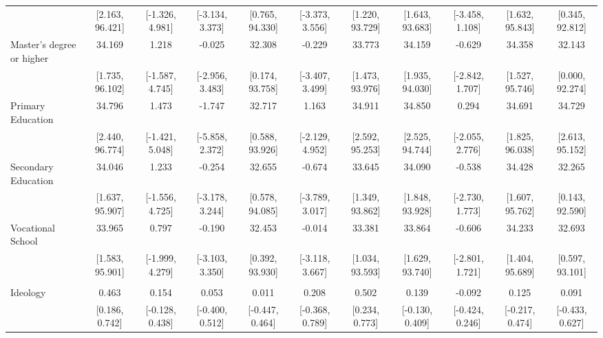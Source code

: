 \documentclass[
  10,
  letterpaper,
  DIV=11,
  numbers=noendperiod]{scrartcl}
\begin{document}
\begin{table}
\begin{tabular}[t]{lcccccccccc}
\hspace{1em} & {}[2.163, 96.421] & {}[-1.326, 4.981] & {}[-3.134, 3.373] & {}[0.765, 94.330] & {}[-3.373, 3.556] & {}[1.220, 93.729] & {}[1.643, 93.683] & {}[-3.458, 1.108] & {}[1.632, 95.843] & {}[0.345, 92.812]\\
\hspace{1em}Master's degree or higher & 34.169 & 1.218 & -0.025 & 32.308 & -0.229 & 33.773 & 34.159 & -0.629 & 34.358 & 32.143\\
\hspace{1em} & {}[1.735, 96.102] & {}[-1.587, 4.745] & {}[-2.956, 3.483] & {}[0.174, 93.758] & {}[-3.407, 3.499] & {}[1.473, 93.976] & {}[1.935, 94.030] & {}[-2.842, 1.707] & {}[1.527, 95.746] & {}[0.000, 92.274]\\
\hspace{1em}Primary Education & 34.796 & 1.473 & -1.747 & 32.717 & 1.163 & 34.911 & 34.850 & 0.294 & 34.691 & 34.729\\
\hspace{1em} & {}[2.440, 96.774] & {}[-1.421, 5.048] & {}[-5.858, 2.372] & {}[0.588, 93.926] & {}[-2.129, 4.952] & {}[2.592, 95.253] & {}[2.525, 94.744] & {}[-2.055, 2.776] & {}[1.825, 96.038] & {}[2.613, 95.152]\\
\hspace{1em}Secondary Education & 34.046 & 1.233 & -0.254 & 32.655 & -0.674 & 33.645 & 34.090 & -0.538 & 34.428 & 32.265\\
\hspace{1em} & {}[1.637, 95.907] & {}[-1.556, 4.725] & {}[-3.178, 3.244] & {}[0.578, 94.085] & {}[-3.789, 3.017] & {}[1.349, 93.862] & {}[1.848, 93.928] & {}[-2.730, 1.773] & {}[1.607, 95.762] & {}[0.143, 92.590]\\
\hspace{1em}Vocational School & 33.965 & 0.797 & -0.190 & 32.453 & -0.014 & 33.381 & 33.864 & -0.606 & 34.233 & 32.693\\
\hspace{1em} & {}[1.583, 95.901] & {}[-1.999, 4.279] & {}[-3.103, 3.350] & {}[0.392, 93.930] & {}[-3.118, 3.667] & {}[1.034, 93.593] & {}[1.629, 93.740] & {}[-2.801, 1.721] & {}[1.404, 95.689] & {}[0.597, 93.101]\\
\addlinespace[0.3em]
\multicolumn{11}{l}{\cellcolor[HTML]{3498DB}{\textbf{Ideology}}}\\
\hspace{1em}Ideology & 0.463 & 0.154 & 0.053 & 0.011 & 0.208 & 0.502 & 0.139 & -0.092 & 0.125 & 0.091\\
\hspace{1em} & {}[0.186, 0.742] & {}[-0.128, 0.438] & {}[-0.400, 0.512] & {}[-0.447, 0.464] & {}[-0.368, 0.789] & {}[0.234, 0.773] & {}[-0.130, 0.409] & {}[-0.424, 0.246] & {}[-0.217, 0.474] & {}[-0.433, 0.627]\\

\end{tabular}
\end{table}
\end{document}
